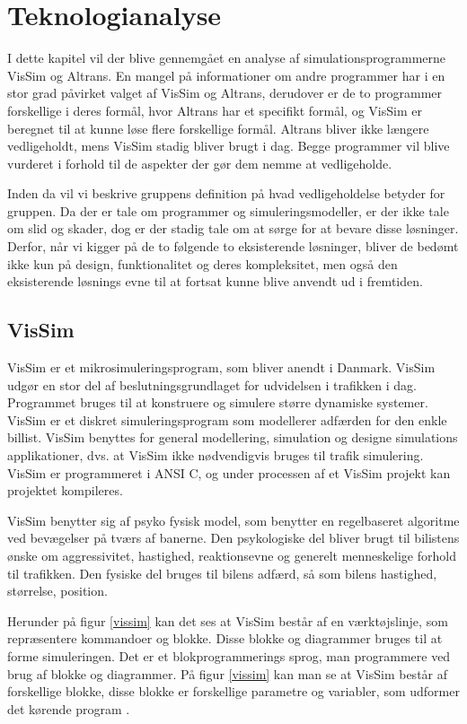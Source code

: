\chapter{Teknologianalyse}\label{Teknologianalyse}
I dette kapitel vil der blive gennemgået en analyse af simulationsprogrammerne VisSim og Altrans. En mangel på informationer om andre programmer har i en stor grad påvirket valget af VisSim og Altrans, derudover er de to programmer forskellige i deres formål, hvor Altrans har et specifikt formål, og VisSim er beregnet til at kunne løse flere forskellige formål. Altrans bliver ikke længere vedligeholdt, mens VisSim stadig bliver brugt i dag. Begge programmer vil blive vurderet i forhold til de aspekter der gør dem nemme at vedligeholde.

Inden da vil vi beskrive gruppens definition på hvad vedligeholdelse betyder for gruppen. Da der er tale om programmer og simuleringsmodeller, er der ikke tale om slid og skader, dog er der stadig tale om at sørge for at bevare disse løsninger. Derfor, når vi kigger på de to følgende to eksisterende løsninger, bliver de bedømt ikke kun på design, funktionalitet og deres kompleksitet, men også den eksisterende løsnings evne til at fortsat kunne blive anvendt ud i fremtiden.

\section{VisSim}
VisSim er et mikrosimuleringsprogram, som bliver anendt i Danmark. VisSim udgør en stor del af beslutningsgrundlaget for udvidelsen i trafikken i dag. Programmet bruges til at konstruere og simulere større dynamiske systemer. VisSim er et diskret simuleringsprogram som modellerer adfærden for den enkle billist. VisSim benyttes for general modellering, simulation og designe simulations applikationer, dvs. at VisSim ikke nødvendigvis bruges til trafik simulering. VisSim er programmeret i ANSI C, og under processen af et VisSim projekt kan projektet kompileres.

VisSim benytter sig af psyko fysisk model, som benytter en regelbaseret algoritme ved bevægelser på tværs af banerne. Den psykologiske del bliver brugt til bilistens ønske om aggressivitet, hastighed, reaktionsevne og generelt menneskelige forhold til trafikken. Den fysiske del bruges til bilens adfærd, så som bilens hastighed, størrelse, position. 

Herunder på figur \ref{vissim} kan det ses at VisSim består af en værktøjslinje, som repræsentere kommandoer og blokke. Disse blokke og diagrammer bruges til at forme simuleringen. Det er et blokprogrammerings sprog, man programmere ved brug af blokke og diagrammer. På figur \ref{vissim} kan man se at VisSim består af forskellige blokke, disse blokke er forskellige parametre og variabler, som udformer det kørende program \cite{vissimfunker}.

